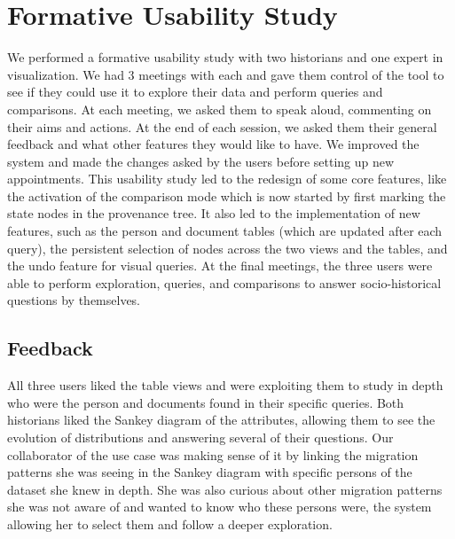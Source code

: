 \section{Formative Usability Study}\label{sec:usability}


We performed a formative usability study with two historians and one expert in visualization. We had 3 meetings with each and gave them control of the tool to see if they could use it to explore their data and perform queries and comparisons. At each meeting, we asked them to speak aloud, commenting on their aims and actions. At the end of each session, we asked them their general feedback and what other features they would like to have. We improved the system and made the changes asked by the users before setting up new appointments. This usability study led to the redesign of some core features, like the activation of the comparison mode which is now started by first marking the state nodes in the provenance tree. It also led to the implementation of new features, such as the person and document tables (which are updated after each query), the persistent selection of nodes across the two views and the tables, and the undo feature for visual queries.
At the final meetings, the three users were able to perform exploration, queries, and comparisons to answer socio-historical questions by themselves.


\subsection{Feedback}

All three users liked the table views and were exploiting them to study in depth who were the person and documents found in their specific queries.
Both historians liked the Sankey diagram of the attributes, allowing them to see the evolution of distributions and answering several of their questions. Our collaborator of the use case \nicole was making sense of it by linking the migration patterns she was seeing in the Sankey diagram with specific persons of the dataset she knew in depth. She was also curious about other migration patterns she was not aware of and wanted to know who these persons were, the system allowing her to select them and follow a deeper exploration.

